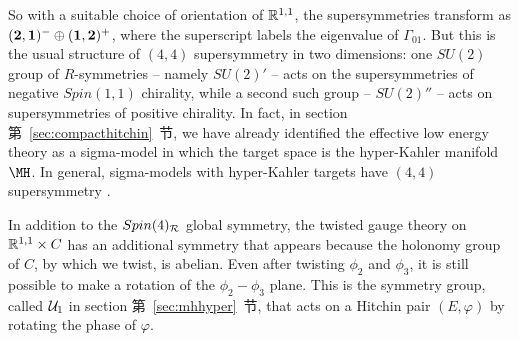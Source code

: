 So with a suitable choice of orientation of $\Bbb{R}^{1,1}$, the
supersymmetries transform as $({\bf 2},{\bf 1})^-\oplus({\bf
1},{\bf 2})^+$, where the superscript labels the eigenvalue of
$\Gamma_{01}$. But this is the usual structure of $(4,4)$
supersymmetry in two dimensions: one $SU(2)$ group of
$R$-symmetries -- namely $SU(2)'$ -- acts on the supersymmetries
of negative $Spin(1,1)$ chirality, while a second such group --
$SU(2)''$ --  acts on supersymmetries of positive chirality. In
fact, in section 第~\ref{sec:compacthitchin}~节, we have already identified the
effective low energy theory as  a sigma-model in which the target
space is the hyper-Kahler manifold $\MH$.  In general,
sigma-models with hyper-Kahler targets have $(4,4)$ supersymmetry
\cite{ref65}.

In addition to the $Spin(4)_{\cal R}$ global symmetry, the twisted
gauge theory on $\Bbb{R}^{1,1}\times C$ has an additional symmetry
that appears because the holonomy group of $C$, by which we twist,
is abelian.  Even after twisting $\phi_2$ and $\phi_3$, it is
still possible to make a rotation of the $\phi_2-\phi_3$ plane.
This is the symmetry group, called ${\cal U}_1$ in section
第~\ref{sec:mhhyper}~节, that acts on a Hitchin pair $(E,\varphi)$ by rotating
the phase of $\varphi$.
